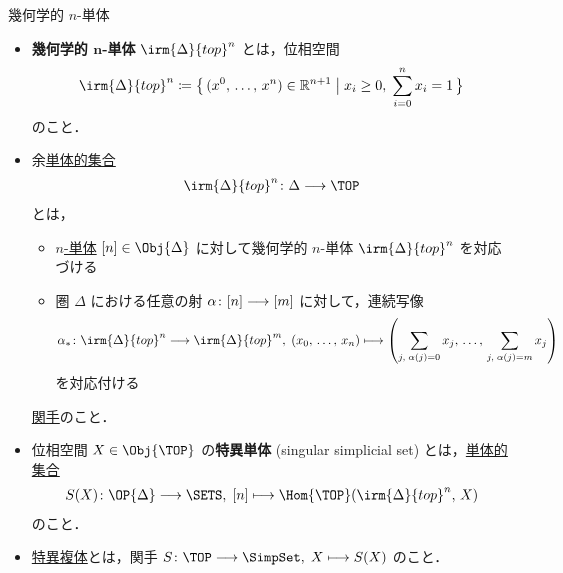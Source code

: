 \documentclass[TQFT_main]{subfiles}
\begin{document}
\begin{mydef}[label=def:simplicial-top,breakable]{幾何学的 $n$-単体}
    \begin{itemize}
        \item \textbf{幾何学的 $\bm{n}$-単体} $\irm{\Delta}{top}^n$ とは，位相空間
        \begin{align}
            \irm{\Delta}{top}^n \coloneqq \bigl\{\, (x^0,\, \dots,\, x^n) \in \mathbb{R}^{n+1}\bigm| x_i \ge 0,\; \sum_{i=0}^n x_i = 1 \,\bigr\} 
        \end{align}
        のこと．
        \item 余\hyperref[def:simplicial-sets]{単体的集合} 
        \begin{align}
            \irm{\Delta}{top}^n \colon \Delta \lto \TOP
        \end{align}
        とは，
        \begin{itemize}
            \item \hyperref[def:simplex-cat]{$n$-単体} $[n] \in \Obj{\Delta}$ に対して幾何学的 $n$-単体 $\irm{\Delta}{top}^n$ を対応づける
            \item 圏 \hyperref[def:simplex-cat]{$\Delta$} における任意の射 $\alpha \colon [n] \longrightarrow [m]$ に対して，連続写像
            \begin{align}
                \alpha_* \colon \irm{\Delta}{top}^n \lto \irm{\Delta}{top}^m,\; (x_0,\, \dots,\, x_n) \lmto \left( \sum_{j,\; \alpha(j) = 0} x_j,\, \dots ,\, \sum_{j,\; \alpha(j) = m} x_j \right) 
            \end{align}
            を対応付ける
        \end{itemize}
        \hyperref[def:functor]{関手}のこと．
        \item 位相空間 $X \in \Obj{\TOP}$ の\textbf{特異単体} (singular simplicial set) とは，\hyperref[def:simplicial-sets]{単体的集合}
        \begin{align}
            S(X) \colon \OP{\Delta} \lto \SETS,\; [n] \lmto \Hom{\TOP} (\irm{\Delta}{top}^n ,\, X)
        \end{align}
        のこと．
        \item \hyperref[def:simplicial-top]{特異複体}とは，関手 $S \colon \TOP \lto \SimpSet,\; X \lmto S(X)$ のこと．
    \end{itemize}
    
\end{mydef}
\end{document}

